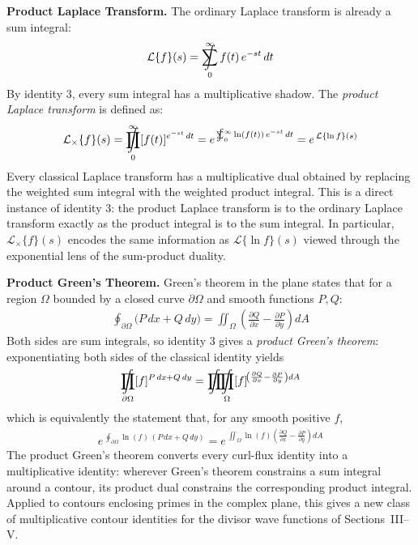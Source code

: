 \documentclass{article}
\DeclareMathOperator*{\SumInt}{%
\mathchoice%
  {\ooalign{$\displaystyle\sum$\cr\hidewidth$\displaystyle\int$\hidewidth\cr}}
  {\ooalign{\raisebox{.14\height}{\scalebox{.7}{$\textstyle\sum$}}\cr\hidewidth$\textstyle\int$\hidewidth\cr}}
  {\ooalign{\raisebox{.2\height}{\scalebox{.6}{$\scriptstyle\sum$}}\cr$\scriptstyle\int$\cr}}
  {\ooalign{\raisebox{.2\height}{\scalebox{.6}{$\scriptstyle\sum$}}\cr$\scriptstyle\int$\cr}}
}
\DeclareMathOperator*{\ProdInt}{%
\mathchoice%
  {\ooalign{$\displaystyle\prod$\cr\hidewidth$\displaystyle\int$\hidewidth\cr}}
  {\ooalign{\raisebox{.14\height}{\scalebox{.7}{$\textstyle\prod$}}\cr\hidewidth$\textstyle\int$\hidewidth\cr}}
  {\ooalign{\raisebox{.2\height}{\scalebox{.6}{$\scriptstyle\prod$}}\cr$\scriptstyle\int$\cr}}
  {\ooalign{\raisebox{.2\height}{\scalebox{.6}{$\scriptstyle\prod$}}\cr$\scriptstyle\int$\cr}}
}
\begin{document}
\medskip
\textbf{Product Laplace Transform.} The ordinary Laplace transform is already a sum integral:
\begin{align*}
\mathcal{L}\{f\}(s) = \SumInt_0^{\infty} f(t)\,e^{-st}\,dt
\end{align*}
By identity 3, every sum integral has a multiplicative shadow. The \emph{product Laplace transform} is defined as:
\begin{align*}
\mathcal{L}_\times\{f\}(s)
  = \ProdInt_0^{\infty} [f(t)]^{e^{-st}\,dt}
  = e^{\,\SumInt_0^{\infty} \ln(f(t))\,e^{-st}\,dt}
  = e^{\,\mathcal{L}\{\ln f\}(s)}
\end{align*}
Every classical Laplace transform has a multiplicative dual obtained by replacing the weighted sum integral with the weighted product integral. This is a direct instance of identity 3: the product Laplace transform is to the ordinary Laplace transform exactly as the product integral is to the sum integral. In particular, $\mathcal{L}_\times\{f\}(s)$ encodes the same information as $\mathcal{L}\{\ln f\}(s)$ viewed through the exponential lens of the sum-product duality.

\medskip
\textbf{Product Green's Theorem.} Green's theorem in the plane states that for a region $\Omega$ bounded by a closed curve $\partial\Omega$ and smooth functions $P, Q$:
\begin{align*}
\oint_{\partial\Omega} \bigl(P\,dx + Q\,dy\bigr)
  = \iint_\Omega \left(\frac{\partial Q}{\partial x} - \frac{\partial P}{\partial y}\right)dA
\end{align*}
Both sides are sum integrals, so identity 3 gives a \emph{product Green's theorem}: exponentiating both sides of the classical identity yields
\begin{align*}
\ProdInt_{\partial\Omega} [f]^{P\,dx + Q\,dy}
  = \ProdInt\!\!\ProdInt_\Omega [f]^{\!\left(\frac{\partial Q}{\partial x} - \frac{\partial P}{\partial y}\right)dA}
\end{align*}
which is equivalently the statement that, for any smooth positive $f$,
\begin{align*}
e^{\,\oint_{\partial\Omega} \ln(f)\,(P\,dx + Q\,dy)}
  = e^{\,\iint_\Omega \ln(f)\left(\frac{\partial Q}{\partial x} - \frac{\partial P}{\partial y}\right)dA}
\end{align*}
The product Green's theorem converts every curl-flux identity into a multiplicative identity: wherever Green's theorem constrains a sum integral around a contour, its product dual constrains the corresponding product integral. Applied to contours enclosing primes in the complex plane, this gives a new class of multiplicative contour identities for the divisor wave functions of Sections~III--V.
\end{document}
